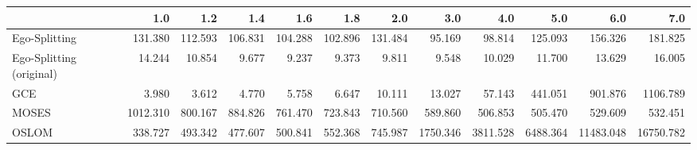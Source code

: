\begin{tabular}{lrrrrrrrrrrr}
\toprule
{} &      1.0 &     1.2 &     1.4 &     1.6 &     1.8 &     2.0 &      3.0 &      4.0 &      5.0 &       6.0 &       7.0 \\
\midrule
Ego-Splitting            &  131.380 & 112.593 & 106.831 & 104.288 & 102.896 & 131.484 &   95.169 &   98.814 &  125.093 &   156.326 &   181.825 \\
Ego-Splitting (original) &   14.244 &  10.854 &   9.677 &   9.237 &   9.373 &   9.811 &    9.548 &   10.029 &   11.700 &    13.629 &    16.005 \\
GCE                      &    3.980 &   3.612 &   4.770 &   5.758 &   6.647 &  10.111 &   13.027 &   57.143 &  441.051 &   901.876 &  1106.789 \\
MOSES                    & 1012.310 & 800.167 & 884.826 & 761.470 & 723.843 & 710.560 &  589.860 &  506.853 &  505.470 &   529.609 &   532.451 \\
OSLOM                    &  338.727 & 493.342 & 477.607 & 500.841 & 552.368 & 745.987 & 1750.346 & 3811.528 & 6488.364 & 11483.048 & 16750.782 \\
\bottomrule
\end{tabular}
